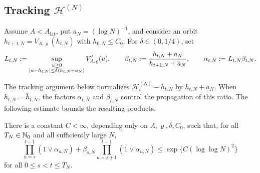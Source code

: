 \documentclass[11pt,reqno,a4paper]{article}
\begin{document}
\subsection{Tracking \texorpdfstring{$\mathscr H^{(N)}$}{H(N)}}
\label{subsec:subcritical-radius-tracking}

Assume $A<A_{\mathrm{lat}}$, put $a_N=(\log N)^{-1}$, and consider an orbit
$h_{t+1,N}=V_{A,\varrho}(h_{t,N})$ with $h_{0,N}\leq C_0$. For
$\delta\in(0,1/4)$, set
\begin{equation*}
  L_{t,N}
  :=
  \sup_{\substack{u\geq0\\
    \abs{u-h_{t,N}}\leq\delta(h_{t,N}+a_N)}}
  V_{A,\varrho}'(u),
  \qquad
  \beta_{t,N}:=\frac{h_{t,N}+a_N}{h_{t+1,N}+a_N},
  \qquad
  \alpha_{t,N}:=L_{t,N}\beta_{t,N}.
\end{equation*}

The tracking argument below normalizes
$\mathscr H_t^{(N)}-\bar h_{t,N}$ by $\bar h_{t,N}+a_N$. When
$h_{t,N}=\bar h_{t,N}$, the factors $\alpha_{t,N}$ and $\beta_{t,N}$ control
the propagation of this ratio. The following estimate bounds the resulting
products.
\begin{lemma}
\label{lem:subcritical-normalized-lattice-amplification}
  There is a constant $C<\infty$, depending only on
  $A,\varrho,\delta,C_0$, such that, for all $T_N\in\mathbb{N}_0$ and all
  sufficiently large $N$,
  \begin{equation}\label{eq:subcritical-global-amplification}
    \prod_{u=s}^{t-1}(1\vee\alpha_{u,N})
    +
    \beta_{s,N}
    \prod_{u=s+1}^{t-1}(1\vee\alpha_{u,N})
    \leq
    \exp\{C(\log\log N)^2\}
  \end{equation}
  for all $0\leq s<t\leq T_N$.
\end{lemma}
\end{document}
